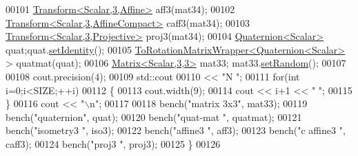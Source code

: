 \begin{DoxyCode}
00101   \hyperlink{group___geometry___module_class_eigen_1_1_transform}{Transform<Scalar,3,Affine>} aff3(mat34);
00102   \hyperlink{group___geometry___module_class_eigen_1_1_transform}{Transform<Scalar,3,AffineCompact>} caff3(mat34);
00103   \hyperlink{group___geometry___module_class_eigen_1_1_transform}{Transform<Scalar,3,Projective>} proj3(mat34);
00104   \hyperlink{group___geometry___module_class_eigen_1_1_quaternion}{Quaternion<Scalar>} quat;quat.\hyperlink{group___geometry___module_a113a5ffea680c7427dc1144d7c66efe9}{setIdentity}();
00105   \hyperlink{struct_to_rotation_matrix_wrapper}{ToRotationMatrixWrapper<Quaternion<Scalar>} > quatmat(quat);
00106   \hyperlink{group___core___module_class_eigen_1_1_matrix}{Matrix<Scalar,3,3>} mat33; mat33.\hyperlink{class_eigen_1_1_plain_object_base_af0e576a0e1aefc9ee346de44cc352ba3}{setRandom}();
00107   
00108   cout.precision(4);
00109   std::cout
00110      << \textcolor{stringliteral}{"N          "};
00111   \textcolor{keywordflow}{for}(\textcolor{keywordtype}{int} i=0;i<SIZE;++i)
00112   \{
00113     cout.width(9);
00114     cout << i+1 << \textcolor{stringliteral}{" "};
00115   \}
00116   cout << \textcolor{stringliteral}{"\(\backslash\)n"};
00117   
00118   bench(\textcolor{stringliteral}{"matrix 3x3"}, mat33);
00119   bench(\textcolor{stringliteral}{"quaternion"}, quat);
00120   bench(\textcolor{stringliteral}{"quat-mat  "}, quatmat);
00121   bench(\textcolor{stringliteral}{"isometry3 "}, iso3);
00122   bench(\textcolor{stringliteral}{"affine3   "}, aff3);
00123   bench(\textcolor{stringliteral}{"c affine3 "}, caff3);
00124   bench(\textcolor{stringliteral}{"proj3     "}, proj3);
00125 \}
00126 
\end{DoxyCode}
